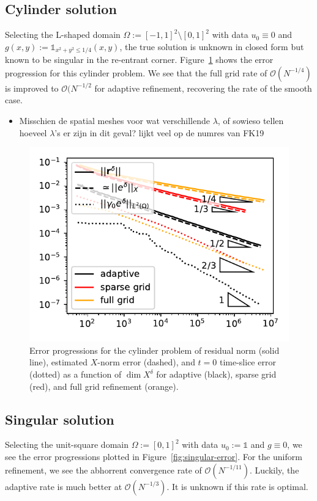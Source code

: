 \documentclass[11pt,a4paper,oneside,english]{amsart}
\numberwithin{equation}{section}
\numberwithin{theorem}{section}
\theoremstyle{definition}
\newcommand{\jw}[1]{{\color{red}{JW: #1}}}
\newcommand{\bbone}{\mathds{1}}
\begin{document}
\subsection{Cylinder solution}
Selecting the L-shaped domain $\Omega := [-1,1]^2 \setminus [0,1]^2$ with data
$u_0 \equiv 0$ and $g(x,y) := \bbone_{{x^2 + y^2 \leq 1/4}}(x,y)$, the true
solution is unknown in closed form but known to be singular in the re-entrant
corner.\jw{is het wel singulier? of alleen minder regulier? hier wil ik een citatie of *iets* anders}
Figure~\ref{fig:cylinder} shows the error progression for this cylinder problem.
We see that the full grid rate of $\mathcal O(N^{-1/4})$ is improved to $\mathcal O(N^{-1/2}$
for adaptive refinement, recovering the rate of the smooth case.

\begin{itemize}
  \item Misschien de spatial meshes voor wat verschillende $\lambda$, of sowieso
    tellen hoeveel $\lambda$'s er zijn in dit geval? lijkt veel op de numres van FK19
\end{itemize}
\begin{figure}
  \includegraphics[width=0.5\linewidth]{cylinder_adaptive_errors}
  \caption{Error progressions for the cylinder problem of residual norm (solid line),
  estimated $X$-norm error (dashed), and $t=0$ time-slice error (dotted) as a function
  of $\dim X^\delta$ for adaptive (black), sparse grid (red), and full grid refinement (orange).}
  \label{fig:cylinder}
\end{figure}

\subsection{Singular solution}
Selecting the unit-square domain $\Omega := [0,1]^2$ with data $u_0 := \bbone$
and $g \equiv 0$, we see the error progressions plotted in Figure~\ref{fig:singular-error}.
For the uniform refinement, we see the abhorrent convergence rate of $\mathcal O(N^{-1/11})$.
Luckily, the adaptive rate is much better at $\mathcal O(N^{-1/3})$. It is unknown
if this rate is optimal.
\end{document}
